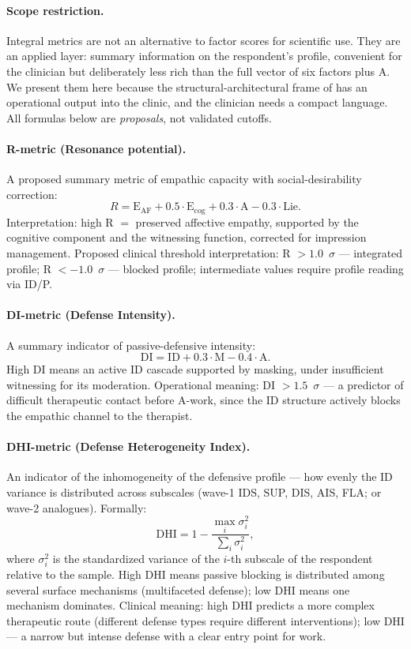 \paragraph{Scope restriction.} Integral metrics are not an alternative to factor scores for scientific use. They are an applied layer: summary information on the respondent's profile, convenient for the clinician but deliberately less rich than the full vector of six factors plus A. We present them here because the structural-architectural frame of \DEIC{} has an operational output into the clinic, and the clinician needs a compact language. All formulas below are \emph{proposals}, not validated cutoffs.

\paragraph{R-metric (Resonance potential).} A proposed summary metric of empathic capacity with social-desirability correction:
\[
R = \text{E}_{\mathrm{AF}} + 0.5 \cdot \text{E}_{\mathrm{cog}} + 0.3 \cdot \text{A} - 0.3 \cdot \text{Lie}.
\]
Interpretation: high R $=$ preserved affective empathy, supported by the cognitive component and the witnessing function, corrected for impression management. Proposed clinical threshold interpretation: R $> 1.0$~$\sigma$ --- integrated profile; R $< -1.0$~$\sigma$ --- blocked profile; intermediate values require profile reading via ID/P.

\paragraph{DI-metric (Defense Intensity).} A summary indicator of passive-defensive intensity:
\[
\text{DI} = \text{ID} + 0.3 \cdot \text{M} - 0.4 \cdot \text{A}.
\]
High DI means an active ID cascade supported by masking, under insufficient witnessing for its moderation. Operational meaning: DI $> 1.5$~$\sigma$ --- a predictor of difficult therapeutic contact before A-work, since the ID structure actively blocks the empathic channel to the therapist.

\paragraph{DHI-metric (Defense Heterogeneity Index).} An indicator of the inhomogeneity of the defensive profile --- how evenly the ID variance is distributed across subscales (wave-1 IDS, SUP, DIS, AIS, FLA; or wave-2 analogues). Formally:
\[
\text{DHI} = 1 - \frac{\max_i \sigma_i^2}{\sum_i \sigma_i^2},
\]
where $\sigma_i^2$ is the standardized variance of the $i$-th subscale of the respondent relative to the sample. High DHI means passive blocking is distributed among several surface mechanisms (multifaceted defense); low DHI means one mechanism dominates. Clinical meaning: high DHI predicts a more complex therapeutic route (different defense types require different interventions); low DHI --- a narrow but intense defense with a clear entry point for work.

